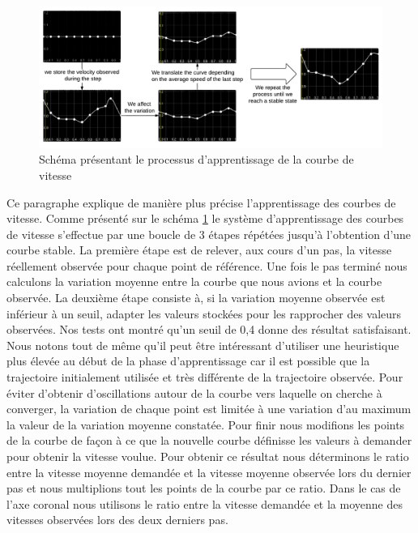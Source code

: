 \documentclass[runningheads,a4paper]{llncs}
\begin{document}
\begin{figure}[h]
\centering
\includegraphics[scale=0.45]{speed_curve_learner.pdf}
\caption{Schéma présentant le processus d'apprentissage de la courbe de vitesse}
\label{fig:speed_curve_learner}
\end{figure}


Ce paragraphe explique de manière plus précise l'apprentissage des courbes de vitesse. Comme présenté sur le schéma \ref{fig:speed_curve_learner} le système d'apprentissage des courbes de vitesse s'effectue par une boucle de 3 étapes répétées jusqu'à l'obtention d'une courbe stable. La première étape est de relever, aux cours d'un pas, la vitesse réellement observée pour chaque point de référence. Une fois le pas terminé nous calculons la variation moyenne entre la courbe que nous avions et la courbe observée. La deuxième étape consiste à, si la variation moyenne observée est inférieur à un seuil, adapter les valeurs stockées pour les rapprocher des valeurs observées. Nos tests ont montré qu'un seuil de 0,4 donne des résultat satisfaisant. Nous notons tout de même qu'il peut être intéressant d'utiliser une heuristique plus élevée au début de la phase d'apprentissage car il est possible que la trajectoire initialement utilisée et très différente de la trajectoire observée.  Pour éviter d'obtenir d'oscillations autour de la courbe vers laquelle on cherche à converger, la variation de chaque point est limitée à une variation d'au maximum la valeur de la variation moyenne constatée. Pour finir nous modifions les points de la courbe de façon à ce que la nouvelle courbe définisse les valeurs à demander pour obtenir la vitesse voulue. Pour obtenir ce résultat nous déterminons le ratio entre la vitesse moyenne demandée et la vitesse moyenne observée lors du dernier pas et nous multiplions tout les points de la courbe par ce ratio. Dans le cas de l'axe coronal nous utilisons le ratio entre la vitesse demandée et la moyenne des vitesses observées lors des deux derniers pas.
\end{document}

